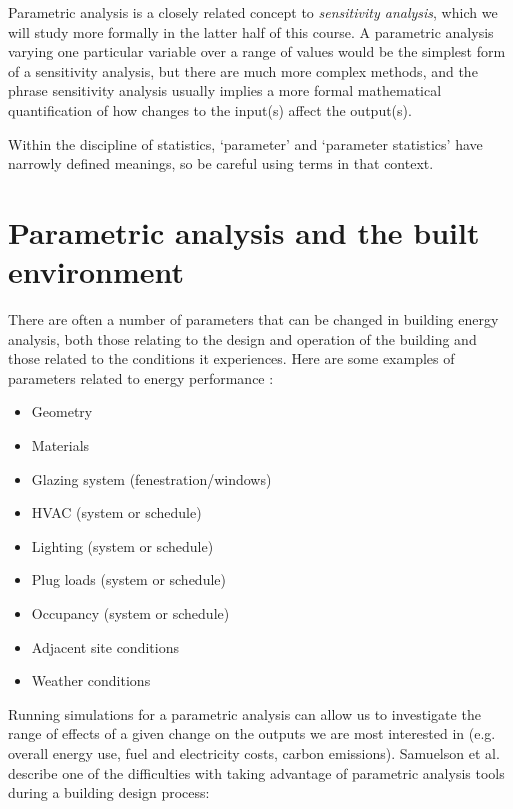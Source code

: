 \documentclass[10pt]{article}
\begin{document}
Parametric analysis is a closely related concept to \textit{sensitivity analysis}, which we will study more formally in the latter half of this course. A parametric analysis varying one particular variable over a range of values would be the simplest form of a sensitivity analysis, but there are much more complex methods, and the phrase sensitivity analysis usually implies a more formal mathematical quantification of how changes to the input(s) affect the output(s).

Within the discipline of statistics, `parameter' and `parameter statistics' have narrowly defined meanings, so be careful using terms in that context.


\section{Parametric analysis and the built environment}

There are often a number of parameters that can be changed in building energy analysis, both those relating to the design and operation of the building and those related to the conditions it experiences. Here are some examples of parameters related to energy performance  \cite{Shiel2018-xh}: 

\begin{itemize}
    \setlength{\itemsep}{0pt}%
    \setlength{\parskip}{0pt}%
    \item Geometry
    \item Materials
    \item Glazing system (fenestration/windows)
    \item HVAC (system or schedule)
    \item Lighting (system or schedule)
    \item Plug loads (system or schedule)
    \item Occupancy (system or schedule)
    \item Adjacent site conditions
    \item Weather conditions
\end{itemize}

Running simulations for a parametric analysis can allow us to investigate the range of effects of a given change on the outputs we are most interested in (e.g. overall energy use, fuel and electricity costs, carbon emissions). Samuelson et al. \cite{Samuelson2016-xw} describe one of the difficulties with taking advantage of parametric analysis tools during a building design process:
\end{document}
